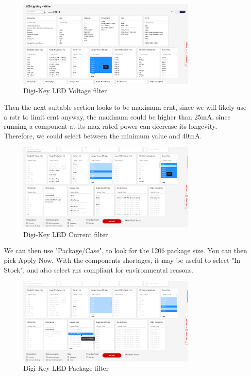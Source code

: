 \documentclass[a4paper,11pt]{report}
\begin{document}
\begin{figure}[H]
\centering
\includegraphics[width=0.8\textwidth]{screenshots/DigiKeyWhiteLEDPageVoltage}
\caption{Digi-Key LED Voltage filter}
\end{figure}

Then the next suitable section looks to be maximum \gls{crnt}, since we will likely use a \gls{rstr} to limit \gls{crnt} anyway, the maximum could be higher than 25mA, since running a component at its max rated power can decrease its longevity. Therefore, we could select between the minimum value and 40mA.

\begin{figure}[H]
\centering
\includegraphics[width=0.8\textwidth]{screenshots/DigiKeyWhiteLEDPageCurrent}
\caption{Digi-Key LED Current filter}
\end{figure}

We can then use "Package/Case", to look for the 1206 package size. You can then pick Apply Now. With the components shortages, it may be useful to select "In Stock", and also select \gls{rhs} compliant for environmental reasons.


\begin{figure}[H]
\centering
\includegraphics[width=0.8\textwidth]{screenshots/DigiKeyWhiteLEDPagePackage}
\caption{Digi-Key LED Package filter}
\end{figure}
\end{document}
